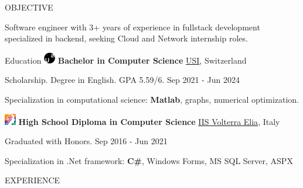 \documentclass{cv} %
\def\intraexpvspace{0.15cm}
\begin{document}
\begin{minipage}[b][0.9\paperheight][t]{0.7\linewidth}

    \headline

\begin{rSection}{OBJECTIVE}
    \item Software engineer with 3+ years of experience in fullstack development specialized in backend, 
    seeking Cloud and Network internship roles.
\end{rSection}

\begin{rSection}{Education}
    \vspace{0.2cm}
    \includegraphics[width=0.5cm, trim={0cm 5cm 0cm 0cm}]{usi-icon.png}
    {\bf Bachelor in Computer Science}
    \hfill \href{https://www.usi.ch/en}{USI}, Switzerland
    \item Scholarship. Degree in English. GPA 5.59/6. 
    \hfill {Sep 2021 - Jun 2024} 
    \item Specialization in computational science: \textbf{Matlab}, graphs, numerical optimization.
    \vspace{\intraexpvspace}
    \vspace{\intraexpvspace}

    \includegraphics[width=0.5cm, trim={0cm 1cm 0cm 0cm}]{iisve-icon.png}
    {\bf High School Diploma in Computer Science}
    \hfill \href{https://www.istitutovolterraelia.it/}{IIS Volterra Elia}, Italy
    \item Graduated with Honors.
    \hfill {Sep 2016 - Jun 2021} 
    \item Specialization in .Net framework: \textbf{C\#}, Windows Forms, MS SQL Server, ASPX
\end{rSection}
\begin{rSection}{EXPERIENCE}
    \vspace{0.2cm}


\end{rSection}
\end{minipage}
\end{document}
